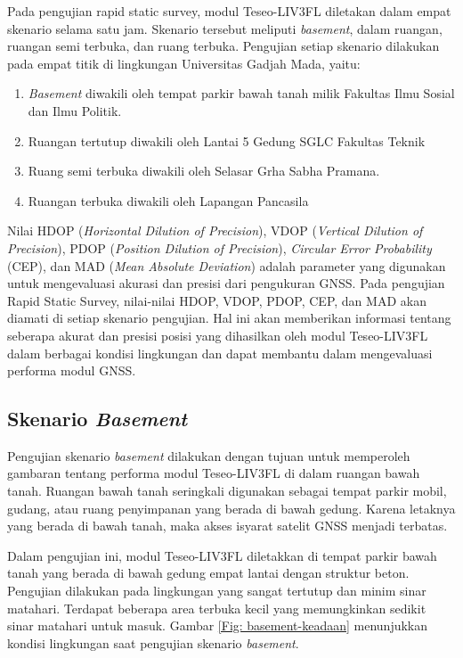 Pada pengujian rapid static survey, modul Teseo-LIV3FL diletakan dalam empat skenario selama satu jam. Skenario tersebut meliputi \textit{basement}, dalam ruangan, ruangan semi terbuka, dan ruang terbuka. Pengujian setiap skenario dilakukan pada empat titik di lingkungan Universitas Gadjah Mada, yaitu:

\begin{enumerate}
	\item \textit{Basement} diwakili oleh tempat parkir bawah tanah milik Fakultas Ilmu Sosial dan Ilmu Politik.
	\item Ruangan tertutup diwakili oleh Lantai 5 Gedung SGLC Fakultas Teknik
	\item Ruang semi terbuka diwakili oleh Selasar Grha Sabha Pramana.
	\item Ruangan terbuka diwakili oleh Lapangan Pancasila
\end{enumerate}

Nilai HDOP (\textit{Horizontal Dilution of Precision}), VDOP (\textit{Vertical Dilution of Precision}), PDOP (\textit{Position Dilution of Precision}), \textit{Circular Error Probability} (CEP), dan MAD (\textit{Mean Absolute Deviation}) adalah parameter yang digunakan untuk mengevaluasi akurasi dan presisi dari pengukuran GNSS. Pada pengujian Rapid Static Survey, nilai-nilai HDOP, VDOP, PDOP, CEP, dan MAD akan diamati di setiap skenario pengujian. Hal ini akan memberikan informasi tentang seberapa akurat dan presisi posisi yang dihasilkan oleh modul Teseo-LIV3FL dalam berbagai kondisi lingkungan dan dapat membantu dalam mengevaluasi performa modul GNSS.

\subsection{Skenario \textit{Basement}}
Pengujian skenario \textit{basement} dilakukan dengan tujuan untuk memperoleh gambaran tentang performa modul Teseo-LIV3FL di dalam ruangan bawah tanah. Ruangan bawah tanah seringkali digunakan sebagai tempat parkir mobil, gudang, atau ruang penyimpanan yang berada di bawah gedung. Karena letaknya yang berada di bawah tanah, maka akses isyarat satelit GNSS menjadi terbatas. 

Dalam pengujian ini, modul Teseo-LIV3FL diletakkan di tempat parkir bawah tanah yang berada di bawah gedung empat lantai dengan struktur beton. Pengujian dilakukan pada lingkungan yang sangat tertutup dan minim sinar matahari. Terdapat beberapa area terbuka kecil yang memungkinkan sedikit sinar matahari untuk masuk. Gambar \ref{Fig: basement-keadaan} menunjukkan kondisi lingkungan saat pengujian skenario \textit{basement}.


